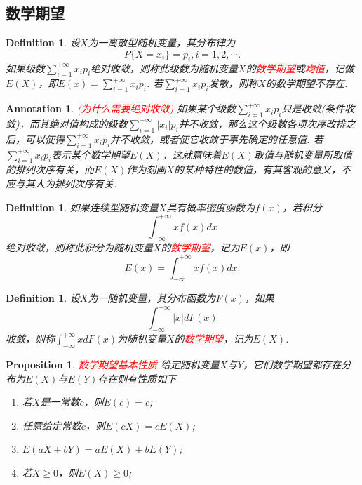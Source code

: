\documentclass{article}
\newtheorem{proposition}[theorem]{Proposition}
\newtheorem{definition}[theorem]{Definition}
\newtheorem{annotation}[theorem]{Annotation}
\newcommand{\redt}[1]{\textcolor{red}{#1}}
\begin{document}
\subsection{数学期望}

\begin{definition}
\rm 设$X$为一离散型随机变量，其分布律为
$$
P\{X=x_i\} = p_i, i= 1,2,\cdots.
$$
如果级数$\sum\limits_{i=1}^{+\infty}x_ip_i$绝对收敛，则称此级数为随机变量$X$的\redt{数学期望}或\redt{均值}，记做$E(X)$，即$E(x) = \sum\limits_{i=1}^{+\infty}x_ip_i$. 若$\sum\limits_{i=1}^{+\infty}x_ip_i$发散，则称$X$的数学期望不存在. 
\end{definition}

\begin{annotation}
\rm \redt{(为什么需要绝对收敛)} 如果某个级数$\sum\limits_{i=1}^{+\infty}x_ip_i$只是收敛(条件收敛)，而其绝对值构成的级数$\sum\limits_{i=1}^{+\infty}|x_i|p_i$并不收敛，那么这个级数各项次序改排之后，可以使得$\sum\limits_{i=1}^{+\infty}x_ip_i$并不收敛，或者使它收敛于事先确定的任意值. 若$\sum\limits_{i=1}^{+\infty}x_ip_i$表示某个数学期望$E(X)$，这就意味着$E(X)$取值与随机变量所取值的排列次序有关，而$E(X)$作为刻画$X$的某种特性的数值，有其客观的意义，不应与其人为排列次序有关.
\end{annotation}

\begin{definition}
\rm 如果连续型随机变量$X$具有概率密度函数为$f(x)$，若积分
$$
\int_{-\infty}^{+\infty} xf(x)dx
$$
绝对收敛，则称此积分为随机变量$X$的\redt{数学期望}，记为$E(x)$，即
$$
E(x) = \int_{-\infty}^{+\infty} xf(x)dx. 
$$
\end{definition}

\begin{definition}
\rm 设$X$为一随机变量，其分布函数为$F(x)$，如果
$$
\int_{-\infty}^{+\infty} |x|dF(x)
$$
收敛，则称$\int_{-\infty}^{+\infty} xdF(x)$为随机变量$X$的\redt{数学期望}，记为$E(X)$. 
\end{definition}

\begin{proposition}
\rm \redt{数学期望基本性质} 给定随机变量$X$与$Y$，它们数学期望都存在分布为$E(X)$与$E(Y)$存在则有性质如下
\begin{enumerate}
	\item 若$X$是一常数$c$，则$E(c) = c$;
	\item 任意给定常数$c$，则$E(cX) = cE(X)$;
	\item $E(aX \pm bY) = aE(X)\pm bE(Y)$;
	\item 若$X \geq 0$，则$E(X) \geq 0$;
\end{enumerate}
\end{proposition}
\end{document}
